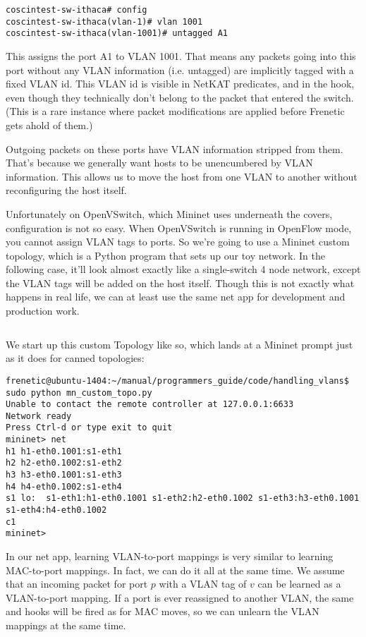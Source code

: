 \begin{verbatim}
coscintest-sw-ithaca# config
coscintest-sw-ithaca(vlan-1)# vlan 1001
coscintest-sw-ithaca(vlan-1001)# untagged A1
\end{verbatim}

This assigns the port A1 to VLAN 1001.  
That means any packets going into this port without any VLAN
information (i.e. untagged) are implicitly tagged with a fixed VLAN id.   This VLAN id is visible in NetKAT
predicates, and in the  hook, even though they technically don't belong to the 
packet that entered the switch.  (This is a rare instance where packet modifications are applied
before Frenetic gets ahold of them.)

Outgoing packets on these ports have VLAN information stripped from them.  That's because we generally 
want hosts to be unencumbered by VLAN information.  This allows us to move the host from one VLAN to another
without reconfiguring the host itself.  

Unfortunately on OpenVSwitch, which Mininet uses 
underneath the covers, configuration is not so easy.  When OpenVSwitch is running in 
OpenFlow mode, you cannot assign VLAN tags to ports.  So we're going to use a Mininet
custom topology, which is a Python program that sets up our toy network.  In the 
following case, it'll look almost exactly like a single-switch 4 node network, except the 
VLAN tags will be added on the host itself.  Though this is not exactly what happens 
in real life, we can at least use the same net app for development and production work.

\inputminted{python}{code/handling_vlans/mn_custom_topo.py}

We start up this custom Topology like so, which lands at a Mininet prompt just as it 
does for canned topologies:

\begin{verbatim}
frenetic@ubuntu-1404:~/manual/programmers_guide/code/handling_vlans$ sudo python mn_custom_topo.py
Unable to contact the remote controller at 127.0.0.1:6633
Network ready
Press Ctrl-d or type exit to quit
mininet> net
h1 h1-eth0.1001:s1-eth1
h2 h2-eth0.1002:s1-eth2
h3 h3-eth0.1001:s1-eth3
h4 h4-eth0.1002:s1-eth4
s1 lo:  s1-eth1:h1-eth0.1001 s1-eth2:h2-eth0.1002 s1-eth3:h3-eth0.1001 s1-eth4:h4-eth0.1002
c1
mininet>
\end{verbatim}

In our net app, learning VLAN-to-port mappings is very similar to learning MAC-to-port mappings.  In fact, 
we can do it all at the
same time.  We assume that an incoming packet for port $p$ with a VLAN tag of $v$ can be learned as a 
VLAN-to-port mapping.  If a port is ever reassigned to another VLAN, the same  and
 hooks will be fired as for MAC moves, so we can unlearn the VLAN mappings at the same
time.  

